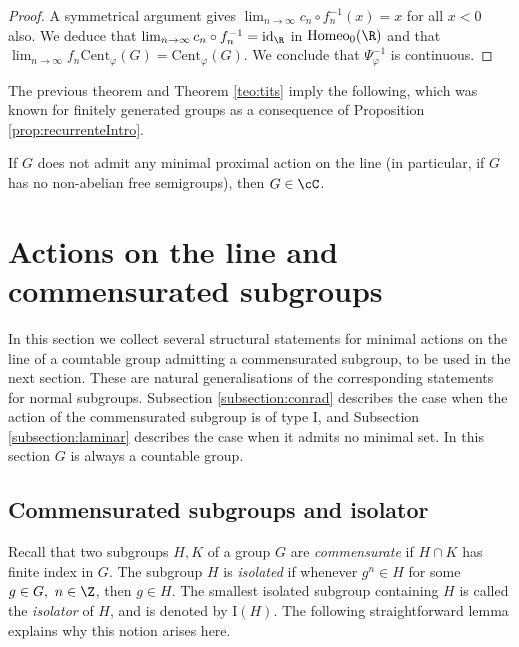 \documentclass[reqno]{amsart}
\begin{document}
\begin{proof}
A symmetrical argument gives $\lim_{n \to \infty}c_n \circ f_n^{-1}(x) = x$ for all $x < 0$ also. We deduce that $\lim_{n \to \infty}c_n \circ f_n^{-1} = \mathrm{id}_\R$ in $\mathrm{Homeo}_0(\R)$ and that $\lim_{n \to \infty} f_n\mathrm{Cent}_\varphi(G) = \mathrm{Cent}_\varphi(G)$. We conclude that $\Psi_\varphi^{-1}$ is continuous.
\end{proof}


The previous theorem and Theorem \ref{teo:tits} imply the following, which was known for finitely generated groups as a consequence of Proposition \ref{prop:recurrenteIntro}.
\begin{cor} \label{cor:abeliano}
If $G$ does not admit any minimal proximal action on the line (in particular, if $G$ has no non-abelian free semigroups), then $G \in \cC$.
\end{cor}


\section{Actions on the line and commensurated subgroups} \label{section:actionsCommensurated}
In this section we collect several structural statements for minimal actions on the line of a countable group admitting a commensurated subgroup, to be used in the next section. These are natural generalisations of the corresponding statements for normal subgroups. Subsection \ref{subsection:conrad} describes the case when the action of the commensurated subgroup is of type I, and Subsection \ref{subsection:laminar} describes the case when it admits no minimal set. In this section $G$ is always a countable group.

\subsection{Commensurated subgroups and isolator} \label{subsection:isolator}

Recall that two subgroups $H, K$ of a group $G$ are \emph{commensurate} if $H\cap K$ has finite index in $G$. The subgroup $H$ is \emph{isolated} if whenever $g^n\in H$ for some $g\in G,\  n\in \Z$, then $g\in H$. The smallest isolated subgroup containing $H$ is called the \emph{isolator} of $H$, and is denoted by $\mathrm{I}(H)$. 
The following straightforward lemma explains why this notion arises here.
\end{document}
